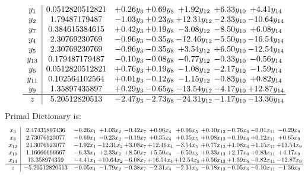 \documentclass[9pt]{article}
\begin{document}
\[\begin{array}{c| c c@{\hskip 2pt} c@{\hskip 2pt} c@{\hskip 2pt} c@{\hskip 2pt} c@{\hskip 2pt} }
 y_{1}   &  0.0512820512821 & +  0.26 y_{3} & +  0.69 y_{8} & +  1.92 y_{12} & +  6.33 y_{10} & +  4.41 y_{14}\\
 y_{2}   &  1.79487179487 & -1.03 y_{3} & +  0.23 y_{8} & + 12.31 y_{12} & -2.33 y_{10} & -10.64 y_{14}\\
 y_{7}   &  0.384615384615 & +  0.42 y_{3} & +  0.19 y_{8} & -3.08 y_{12} & -8.50 y_{10} & +  6.08 y_{14}\\
 y_{4}   &  2.30769230769 & -0.96 y_{3} & -0.35 y_{8} & -12.46 y_{12} & -5.50 y_{10} & -16.54 y_{14}\\
 y_{5}   &  2.30769230769 & -0.96 y_{3} & -0.35 y_{8} & +  3.54 y_{12} & +  6.50 y_{10} & -12.54 y_{14}\\
 y_{13}   &  0.179487179487 & -0.10 y_{3} & -0.08 y_{8} & -0.77 y_{12} & -0.33 y_{10} & -0.56 y_{14}\\
 y_{6}   &  0.0512820512821 & +  0.76 y_{3} & +  0.19 y_{8} & -1.08 y_{12} & -2.17 y_{10} & -1.59 y_{14}\\
 y_{11}   &  0.102564102564 & +  0.01 y_{3} & -0.12 y_{8} & -1.15 y_{12} & -0.83 y_{10} & +  0.82 y_{14}\\
 y_{9}   &  1.35897435897 & +  0.29 y_{3} & -0.65 y_{8} & -13.54 y_{12} & -4.17 y_{10} & + 12.87 y_{14}\\
\hline
z    &  5.20512820513 & -2.47 y_{3} & -2.73 y_{8} & -24.31 y_{12} & -1.17 y_{10} & -13.36 y_{14}\\
\end{array}\]
Primal Dictionary is:
\[\begin{array}{c| c c@{\hskip 2pt} c@{\hskip 2pt} c@{\hskip 2pt} c@{\hskip 2pt} c@{\hskip 2pt} c@{\hskip 2pt} c@{\hskip 2pt} c@{\hskip 2pt} c@{\hskip 2pt} }
 x_{3}   &  2.47435897436 & -0.26 x_{1} & +  1.03 x_{2} & -0.42 x_{7} & +  0.96 x_{4} & +  0.96 x_{5} & +  0.10 x_{13} & -0.76 x_{6} & -0.01 x_{11} & -0.29 x_{9}\\
 x_{8}   &  2.73076923077 & -0.69 x_{1} & -0.23 x_{2} & -0.19 x_{7} & +  0.35 x_{4} & +  0.35 x_{5} & +  0.08 x_{13} & -0.19 x_{6} & +  0.12 x_{11} & +  0.65 x_{9}\\
 x_{12}   &  24.3076923077 & -1.92 x_{1} & -12.31 x_{2} & +  3.08 x_{7} & + 12.46 x_{4} & -3.54 x_{5} & +  0.77 x_{13} & +  1.08 x_{6} & +  1.15 x_{11} & + 13.54 x_{9}\\
 x_{10}   &  1.16666666667 & -6.33 x_{1} & +  2.33 x_{2} & +  8.50 x_{7} & +  5.50 x_{4} & -6.50 x_{5} & +  0.33 x_{13} & +  2.17 x_{6} & +  0.83 x_{11} & +  4.17 x_{9}\\
 x_{14}   &  13.358974359 & -4.41 x_{1} & + 10.64 x_{2} & -6.08 x_{7} & + 16.54 x_{4} & + 12.54 x_{5} & +  0.56 x_{13} & +  1.59 x_{6} & -0.82 x_{11} & -12.87 x_{9}\\
\hline
z    &  -5.20512820513 & -0.05 x_{1} & -1.79 x_{2} & -0.38 x_{7} & -2.31 x_{4} & -2.31 x_{5} & -0.18 x_{13} & -0.05 x_{6} & -0.10 x_{11} & -1.36 x_{9}\\
\end{array}\]
\end{document}
